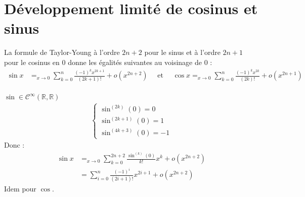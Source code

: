 \documentclass[../main.tex]{subfiles}
\begin{document}
\section{Développement limité de cosinus et sinus}
\begin{tcolorbox}[title=Propostion 25.30, title filled=false, colframe=lightblue, colback=lightblue!10!white]
    La formule de Taylor-Young à l'ordre $2n + 2$ pour le sinus et à l'ordre $2n + 1$ pour le cosinus en $0$ donne les égalités suivantes au voisinage de $0$ : 
    \begin{align*}
        \sin x &=_{x\to 0} \sum_{k=0}^{n} \frac{(-1)^k x^{2k+1}}{(2k+1)!} + o(x^{2n+2}) \quad \text{ et } \quad \cos x =_{x\to 0} \sum_{k=0}^{n} \frac{(-1)^k x^{2k}}{(2k)!} + o(x^{2n+1}) \\
    \end{align*}
\end{tcolorbox}

\noindent $\sin \in \mathcal{C}^{\infty}(\mathbb{R}, \mathbb{R})$
\begin{align*}
    \begin{cases}
        \sin^{(2k)}(0) = 0 \\
        \sin^{(2k+1)}(0) = 1 \\
        \sin^{(4k+3)}(0) = -1
    \end{cases}
\end{align*}
Donc : 
\begin{align*}
    \sin x &=_{x\to 0} \sum_{k=0}^{2n+2} \frac{\sin^{(k)}(0)}{k!}x^k + o(x^{2n+2}) \\
    &= \sum_{i=0}^{n} \frac{(-1)^i}{(2i+1)!}x^{2i+1} + o(x^{2n+2})
\end{align*}
Idem pour $\cos$.
\end{document}
